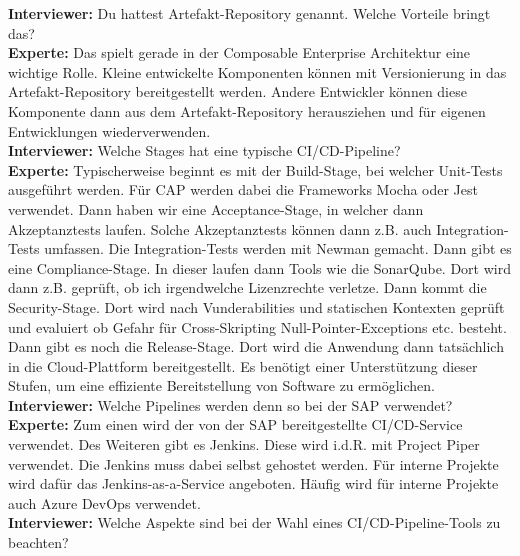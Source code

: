 \begin{linenumbers}
\textbf{Interviewer:} Du hattest Artefakt-Repository genannt. Welche Vorteile bringt das?\\
\textbf{Experte:} Das spielt gerade in der Composable Enterprise Architektur eine wichtige Rolle. Kleine entwickelte Komponenten können mit Versionierung in das Artefakt-Repository bereitgestellt werden. Andere Entwickler können diese Komponente dann aus dem Artefakt-Repository herausziehen und für eigenen Entwicklungen wiederverwenden.\\
\textbf{Interviewer:} Welche Stages hat eine typische CI/CD-Pipeline?\\ 
\textbf{Experte:} Typischerweise beginnt es mit der Build-Stage, bei welcher Unit-Tests ausgeführt werden. Für CAP werden dabei die Frameworks Mocha oder Jest verwendet. Dann haben wir eine Acceptance-Stage, in welcher dann Akzeptanztests laufen. Solche Akzeptanztests können dann z.B. auch Integration-Tests umfassen. Die Integration-Tests werden mit Newman gemacht. Dann gibt es eine Compliance-Stage. In dieser laufen dann Tools wie die SonarQube. Dort wird dann z.B. geprüft, ob ich irgendwelche Lizenzrechte verletze. Dann kommt die Security-Stage. Dort wird nach Vunderabilities und statischen Kontexten geprüft und evaluiert ob Gefahr für Cross-Skripting Null-Pointer-Exceptions etc. besteht. Dann gibt es noch die Release-Stage. Dort wird die Anwendung dann tatsächlich in die Cloud-Plattform bereitgestellt. Es benötigt einer Unterstützung dieser Stufen, um eine effiziente Bereitstellung von Software zu ermöglichen.\\
\textbf{Interviewer:} Welche Pipelines werden denn so bei der SAP verwendet?\\
\textbf{Experte:} Zum einen wird der von der SAP bereitgestellte CI/CD-Service verwendet. Des Weiteren gibt es Jenkins. Diese wird i.d.R. mit Project Piper verwendet. Die Jenkins muss dabei selbst gehostet werden. Für interne Projekte wird dafür das Jenkins-as-a-Service angeboten. Häufig wird für interne Projekte auch Azure DevOps verwendet.\\
\textbf{Interviewer:} Welche Aspekte sind bei der Wahl eines CI/CD-Pipeline-Tools zu beachten?\\

\end{linenumbers}
